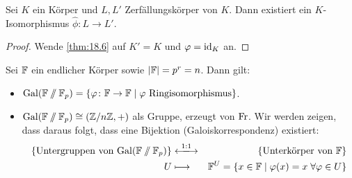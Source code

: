 \documentclass[12pt,a4paper]{scrartcl}
\begin{document}
\begin{satz}
	Sei $K$ ein Körper und $L, L'$ Zerfällungskörper von $K$. Dann existiert ein $K$-Isomorphismus $\hat\phi\colon L\to L'$. 
\end{satz}
\begin{proof}
	Wende \cref{thm:18.6} auf $K' = K$ und $\varphi = \operatorname{id}_K$ an.
\end{proof}
\begin{satz}
	Sei $\mathbb F$ ein endlicher Körper sowie $|\mathbb F| = p^r = n$. Dann gilt:
	\begin{itemize}
		\item $\operatorname{Gal}(\mathbb F\sslash\mathbb F_p) = \{\varphi\colon \mathbb F\to \mathbb F\mid\text{$\varphi$ Ringisomorphismus}\}$.
		\item $\operatorname{Gal}(\mathbb F\sslash\mathbb F_p) \cong (\mathbb Z/n\mathbb Z, +)$ als Gruppe, erzeugt von $\operatorname{Fr}$. Wir werden zeigen, dass daraus folgt, dass eine Bijektion (Galoiskorrespondenz) existiert:
		\begin{eqnarray*}
			\{\text{Untergruppen von $\Gal(\IF\sslash\IF_p)$}\}&\xlongleftrightarrow{1:1}&\{\text{Unterkörper von $\IF$}\}\\
			U &\longmapsto & \IF^U = \{x\in\IF\mid \phi(x) = x \;\forall \phi\in U\}
		\end{eqnarray*}
	\end{itemize}
\end{satz}



\end{document}
